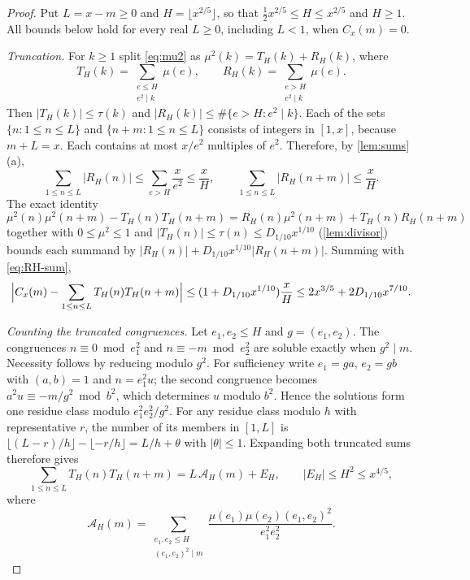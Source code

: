 \begin{proof}
Put $L=x-m\ge0$ and $H=\lfloor x^{2/5}\rfloor$, so that $\frac12x^{2/5}\le H\le x^{2/5}$ and $H\ge1$. All bounds below hold for every real $L\ge0$, including $L<1$, when $C_x(m)=0$.

\emph{Truncation.} For $k\ge1$ split \eqref{eq:mu2} as $\mu^2(k)=T_H(k)+R_H(k)$, where
\[
T_H(k)=\sum_{\substack{e\le H\\e^2\mid k}}\mu(e),\qquad R_H(k)=\sum_{\substack{e>H\\e^2\mid k}}\mu(e).
\]
Then $|T_H(k)|\le\tau(k)$ and $|R_H(k)|\le\#\{e>H:e^2\mid k\}$. Each of the sets $\{n:1\le n\le L\}$ and $\{n+m:1\le n\le L\}$ consists of integers in $[1,x]$, because $m+L=x$. Each contains at most $x/e^2$ multiples of $e^2$. Therefore, by \cref{lem:sums}(a),
\begin{equation}\label{eq:RH-sum}
\sum_{1\le n\le L}|R_H(n)|\le\sum_{e>H}\frac x{e^2}\le\frac xH,\qquad\sum_{1\le n\le L}|R_H(n+m)|\le\frac xH.
\end{equation}
The exact identity
\[
\mu^2(n)\mu^2(n+m)-T_H(n)T_H(n+m)=R_H(n)\mu^2(n+m)+T_H(n)R_H(n+m)
\]
together with $0\le\mu^2\le1$ and $|T_H(n)|\le\tau(n)\le D_{1/10}x^{1/10}$ (\cref{lem:divisor}) bounds each summand by $|R_H(n)|+D_{1/10}x^{1/10}|R_H(n+m)|$. Summing with \eqref{eq:RH-sum},
\begin{equation}\label{eq:corr-trunc}
\Bigl|C_x(m)-\sum_{1\le n\le L}T_H(n)T_H(n+m)\Bigr|\le(1+D_{1/10}x^{1/10})\frac xH\le2x^{3/5}+2D_{1/10}x^{7/10}.
\end{equation}

\emph{Counting the truncated congruences.} Let $e_1,e_2\le H$ and $g=(e_1,e_2)$. The congruences $n\equiv0\bmod e_1^2$ and $n\equiv-m\bmod e_2^2$ are soluble exactly when $g^2\mid m$. Necessity follows by reducing modulo $g^2$. For sufficiency write $e_1=ga$, $e_2=gb$ with $(a,b)=1$ and $n=e_1^2u$; the second congruence becomes $a^2u\equiv-m/g^2\bmod b^2$, which determines $u$ modulo $b^2$. Hence the solutions form one residue class modulo $e_1^2e_2^2/g^2$. For any residue class modulo $h$ with representative $r$, the number of its members in $[1,L]$ is $\lfloor(L-r)/h\rfloor-\lfloor-r/h\rfloor=L/h+\theta$ with $|\theta|\le1$. Expanding both truncated sums therefore gives
\begin{equation}\label{eq:corr-AH}
\sum_{1\le n\le L}T_H(n)T_H(n+m)=L\,\mathcal A_H(m)+E_H,\qquad|E_H|\le H^2\le x^{4/5},
\end{equation}
where
\[
\mathcal A_H(m)=\sum_{\substack{e_1,e_2\le H\\(e_1,e_2)^2\mid m}}\frac{\mu(e_1)\mu(e_2)(e_1,e_2)^2}{e_1^2e_2^2}.
\]


\end{proof}
